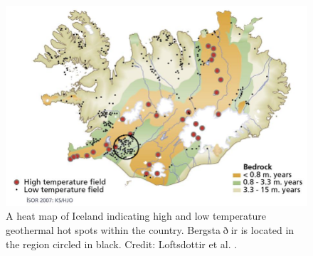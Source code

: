 \begin{figure}[h]
	\centering
	
	\includegraphics[width=\textwidth]{figures/IcelandGeothermalMap} 

	\caption[A heat map of Iceland indicating high and low temperature geothermal hot spots within the country. Bergsta$\eth$ir is located in the region circled in black. Credit: Loftsdottir et al..]{A heat map of Iceland indicating high and low temperature geothermal hot spots within the country. Bergsta$\eth$ir is located in the region circled in black. Credit: Loftsdottir et al. \cite{Loftsdottir2006}.}
	\label{fig:Icelandheatmap}
\end{figure}